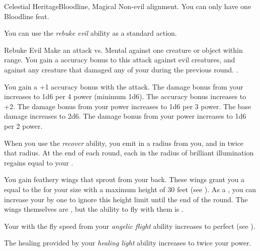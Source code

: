     \begin{magicalfeat}{Celestial Heritage}{Bloodline, Magical}
        \featpre Non-evil alignment.
         You can only have one Bloodline feat.

         You can use the \textit{rebuke evil} ability as a standard action.
        \begin{magicalactiveability}{Rebuke Evil}
            \rankline
            Make an attack vs. Mental against one creature or object within \rngmed range.
            You gain a  accuracy bonus to this attack against evil creatures, and against any creature that damaged any of your  during the previous round.
            \hit {}.

            \rankline
             You gain a +1 accuracy bonus with the attack.
             The damage bonus from your  increases to 1d6 per 4 power (minimum 1d6).
             The accuracy bonus increases to +2.
             The damage bonus from your power increases to 1d6 per 3 power.
             The base damage increases to 2d6.
             The damage bonus from your power increases to 1d6 per 2 power.
        \end{magicalactiveability}

         When you use the \textit{recover} ability, you  emit  in a \largearea radius  from you, and  in twice that radius.
        At the end of each round, each  in the radius of brilliant illumination regains  equal to your .

         You gain feathery wings that sprout from your back.
        These wings grant you a  equal to the  for your size with a maximum height of 30 feet (see ).
        As a , you can increase your  by one to ignore this height limit until the end of the round.
        The wings themselves are , but the ability to fly with them is \magical.

         Your  with the fly speed from your \textit{angelic flight} ability increases to perfect (see ).

         The healing provided by your \textit{healing light} ability increases to twice your power.
    \end{magicalfeat}

